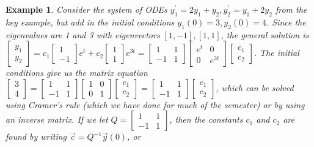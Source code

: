 \documentclass[10pt]{article}
\theoremstyle{plain}
\theoremstyle{box}
\newtheorem{example}{Example}
\begin{document}
\begin{example}
Consider the system of ODEs $y_1^\prime = 2y_1+y_2, y_2^\prime= y_1+2y_2$ from the key example, but add in the initial conditions $y_1(0)=3,y_2(0)=4$. Since the eigenvalues are 1 and 3 with eigenvectors $[1,-1],[1,1]$, the general solution is 
$
\begin{bmatrix}y_1\\y_2\end{bmatrix} 
= c_1\begin{bmatrix}1\\-1\end{bmatrix}e^t 
+ c_2\begin{bmatrix}1\\1\end{bmatrix}e^{3t}
=
\begin{bmatrix}1 &1\\-1&1\end{bmatrix}
\begin{bmatrix}e^t&0\\0&e^{3t}\end{bmatrix}
\begin{bmatrix}c_1\\c_2\end{bmatrix} 
$. 
The initial conditions give us the matrix equation 
$
\begin{bmatrix}3\\4\end{bmatrix} 
= 
\begin{bmatrix}1 &1\\-1&1\end{bmatrix}
\begin{bmatrix}1&0\\0&1\end{bmatrix}
\begin{bmatrix}c_1\\c_2\end{bmatrix} 
=
\begin{bmatrix}1 &1\\-1&1\end{bmatrix}
\begin{bmatrix}c_1\\c_2\end{bmatrix} 
$, which can be solved using Cramer's rule (which we have done for much of the semester) or by using an inverse matrix.  If we let $Q = \begin{bmatrix}1 &1\\-1&1\end{bmatrix}$, then the constants $c_1$ and $c_2$ are found by writing $\vec c = Q^{-1} \vec y(0)$, or 

\end{example}
\end{document}
